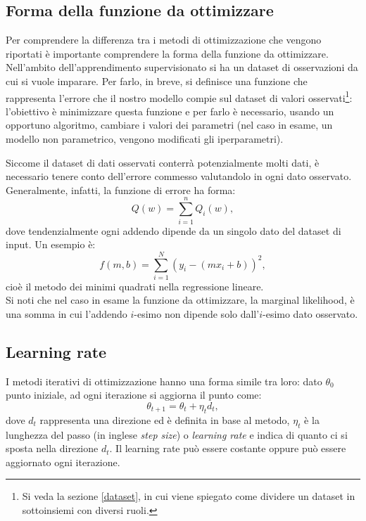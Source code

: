 \subsection{Forma della funzione da ottimizzare}\label{costfunction}
Per comprendere la differenza tra i metodi di ottimizzazione che vengono riportati è importante comprendere la forma della funzione da ottimizzare.
Nell'ambito dell'apprendimento supervisionato si ha un dataset di osservazioni da cui si vuole imparare. Per farlo, in breve, si definisce una funzione che rappresenta l'errore che il nostro modello compie sul dataset di valori osservati\footnote{Si veda la sezione \ref{dataset}, in cui viene spiegato come dividere un dataset in sottoinsiemi con diversi ruoli.}: l'obiettivo è minimizzare questa funzione e per farlo è necessario, usando un opportuno algoritmo, cambiare i valori dei parametri (nel caso in esame, un modello non parametrico, vengono modificati gli iperparametri).

\newpage

Siccome il dataset di dati osservati conterrà potenzialmente molti dati, è necessario tenere conto dell'errore commesso valutandolo in ogni dato osservato. Generalmente, infatti, la funzione di errore ha forma:
\[
Q(w)=\sum_{i=1}^{n}Q_i(w),
\]
dove tendenzialmente ogni addendo dipende da un singolo dato del dataset di input. Un esempio è:
\[
f(m,b)=\sum_{i=1}^{N}(y_i-(mx_i+b))^2,
\]
cioè il metodo dei minimi quadrati nella regressione lineare.\\
Si noti che nel caso in esame la funzione da ottimizzare, la marginal likelihood, è una somma in cui l'addendo $i$-esimo non dipende solo dall'$i$-esimo dato osservato.


\subsection{Learning rate}
I metodi iterativi di ottimizzazione hanno una forma simile tra loro: dato $\theta_0$ punto iniziale, ad ogni iterazione si aggiorna il punto come:
\[
\theta_{t+1}=\theta_t+\eta_td_t,
\]
dove $d_t$ rappresenta una direzione ed è definita in base al metodo, $\eta_t$ è la lunghezza del passo (in inglese \textit{step size}) o \textit{learning rate} e indica di quanto ci si sposta nella direzione $d_t$. Il learning rate può essere costante oppure può essere aggiornato ogni iterazione.


\newpage

